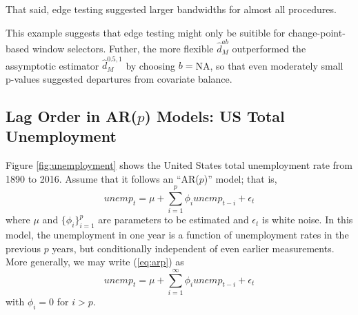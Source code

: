 \documentclass[12pt]{article}\usepackage[]{graphicx}\usepackage[]{color}
\newcommand{\dalphaU}{\bar{\hat{d}}_\alpha}
\newcommand{\dhat}{\hat{d}}
\newcommand{\dhatm}{\hat{d}_M}
\newcommand{\dhatmab}{\hat{d}^{ab}_M}
\begin{document}
That said, edge testing suggested larger bandwidths for almost all
procedures.


This example suggests that edge testing might only be suitible for
change-point-based window selectors.
Futher, the more flexible $\dhatmab$ outperformed the
assymptotic estimator $\dhat_M^{0.5,1}$ by choosing
$b=$NA, so that even moderately small p-values
suggested departures from covariate balance.

\subsection{Lag Order in AR($p$) Models: US Total Unemployment}



Figure \ref{fig:unemployment} shows the United States total
unemployment rate from 1890 to 2016.
Assume that it follows an ``AR($p$)'' model; that is,
\begin{equation}\label{eq:arp}
unemp_t=\mu + \displaystyle\sum_{i=1}^p \phi_i unemp_{t-i}+\epsilon_t
\end{equation}
where $\mu$ and $\{\phi_i\}_{i=1}^p$ are parameters to be estimated
and $\epsilon_t$ is white noise.
In this model, the unemployment in one year is a function of
unemployment rates in the previous $p$ years, but conditionally
independent of even earlier measurements.
More generally, we may write (\ref{eq:arp}) as
\begin{equation}\label{eq:arpinf}
unemp_t=\mu+\displaystyle\sum_{i=1}^\infty \phi_i
unemp_{t-i}+\epsilon_t
\end{equation}
with $\phi_i=0$ for $i>p$.
\end{document}
